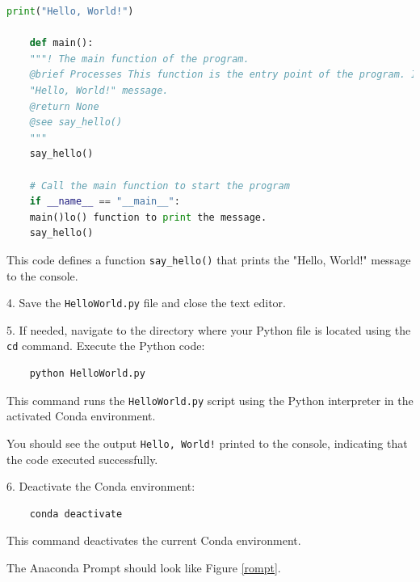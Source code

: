 \begin{lstlisting}[language=Python]
	print("Hello, World!")
	
	def main():
	"""! The main function of the program.
	@brief Processes This function is the entry point of the program. It calls the say_hello() function to print the
	"Hello, World!" message.
	@return None
	@see say_hello()
	"""
	say_hello()
	
	# Call the main function to start the program
	if __name__ == "__main__":
	main()lo() function to print the message.
	say_hello()
\end{lstlisting}

This code defines a function \texttt{say\_hello()} that prints the "Hello, World!" message to the console.


4. Save the \texttt{HelloWorld.py} file and close the text editor.

5. If needed, navigate to the directory where your Python file is located using the \texttt{cd} command. Execute the Python code:

\begin{verbatim}
	python HelloWorld.py
\end{verbatim}

This command runs the \texttt{HelloWorld.py} script using the Python interpreter in the activated Conda environment.

You should see the output \texttt{Hello, World!} printed to the console, indicating that the code executed successfully.

6. Deactivate the Conda environment:

\begin{verbatim}
	conda deactivate
\end{verbatim}

This command deactivates the current Conda environment.

The Anaconda Prompt should look like Figure \ref{rompt}.

